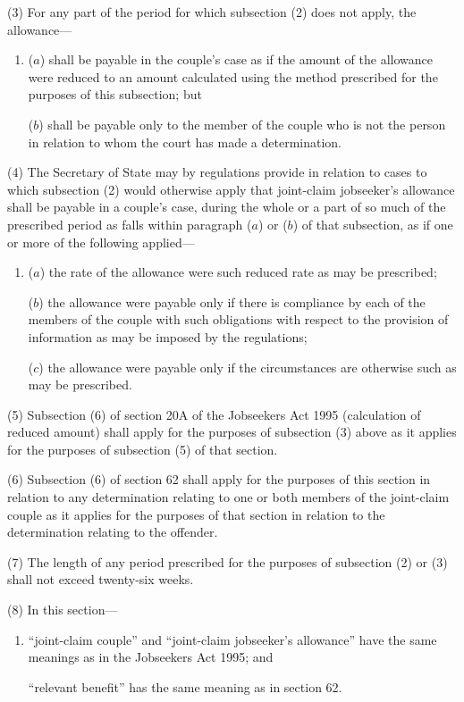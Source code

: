 \documentclass[12pt,a4paper]{article}
\begin{document}
(3) For any part of the period for which subsection (2)  does not apply, the allowance—
\begin{enumerate}\item[]
($a$) shall be payable in the couple’s case as if the amount of the allowance were reduced to an amount calculated using the method prescribed for the purposes of this subsection; but

($b$) shall be payable only to the member of the couple who is not the person in relation to whom the court has made a determination.
\end{enumerate}

(4) The Secretary of State may by regulations provide in relation to cases to which subsection (2)  would otherwise apply that joint-claim jobseeker’s allowance shall be payable in a couple’s case, during the whole or a part of so much of the prescribed period as falls within paragraph ($a$)  or ($b$)  of that subsection, as if one or more of the following applied—
\begin{enumerate}\item[]
($a$) the rate of the allowance were such reduced rate as may be prescribed;

($b$) the allowance were payable only if there is compliance by each of the members of the couple with such obligations with respect to the provision of information as may be imposed by the regulations;

($c$) the allowance were payable only if the circumstances are otherwise such as may be prescribed.
\end{enumerate}

(5) Subsection (6)  of section 20A of the Jobseekers Act 1995 (calculation of reduced amount) shall apply for the purposes of subsection (3)  above as it applies for the purposes of subsection (5)  of that section.

(6) Subsection (6)  of section 62 shall apply for the purposes of this section in relation to any determination relating to one or both members of the joint-claim couple as it applies for the purposes of that section in relation to the determination relating to the offender.

(7) The length of any period prescribed for the purposes of subsection (2)  or (3)  shall not exceed twenty-six weeks.

(8) In this section—
\begin{enumerate}\item[]
    “joint-claim couple” and “joint-claim jobseeker’s allowance” have the same meanings as in the Jobseekers Act 1995; and

    “relevant benefit” has the same meaning as in section 62.  
\end{enumerate}
\end{document}
